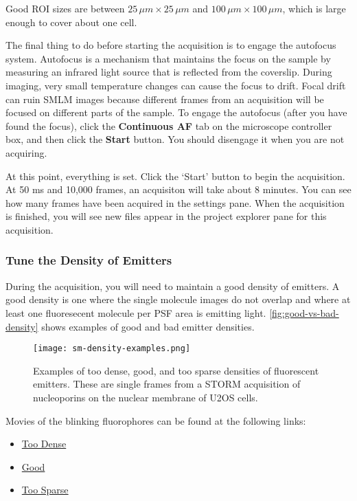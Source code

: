 \documentclass[10pt,a4paper,oneside]{book}
\begin{document}
Good ROI sizes are between $25 \, \mu m\times 25 \, \mu m$ and $100 \, \mu m\times 100 \, \mu m$, which is large enough to cover about one cell.

The final thing to do before starting the acquisition is to engage the autofocus system. Autofocus is a mechanism that maintains the focus on the sample by measuring an infrared light source that is reflected from the coverslip. During imaging, very small temperature changes can cause the focus to drift. Focal drift can ruin SMLM images because different frames from an acquisition will be focused on different parts of the sample. To engage the autofocus (after you have found the focus), click the \textbf{Continuous AF} tab on the microscope controller box, and then click the \textbf{Start} button. You should disengage it when you are not acquiring.

At this point, everything is set. Click the `Start' button to begin the acquisition. At 50 ms and 10,000 frames, an acquisiton will take about 8 minutes. You can see how many frames have been acquired in the settings pane. When the acquisition is finished, you will see new files appear in the project explorer pane for this acquisition.

\subsubsection{Tune the Density of Emitters}

During the acquisition, you will need to maintain a good density of emitters. A good density is one where the single molecule images do not overlap and where at least one fluoresecent molecule per PSF area is emitting light. \autoref{fig:good-vs-bad-density} shows examples of good and bad emitter densities.

\begin{figure}[ht]
    \centering
    \texttt{[image: sm-density-examples.png]}
    \caption{Examples of too dense, good, and too sparse densities of fluorescent emitters. These are single frames from a STORM acquisition of nucleoporins on the nuclear membrane of U2OS cells.}
    \label{fig:good-vs-bad-density}
\end{figure}

Movies of the blinking fluorophores can be found at the following links:

\begin{itemize}
    \item \href{https://drive.google.com/file/d/12zIK-BqMl0qttkYljKi7P9xZ3krMvthe/view?usp=sharing}{Too Dense}
    \item \href{https://drive.google.com/file/d/1Is4U-K297sku4u20OJqwY6IOUags1bLl/view?usp=sharing}{Good}
    \item \href{https://drive.google.com/file/d/1W2AxVjYirPj8t8d2__m8rNoNTUyM3RfY/view?usp=sharing}{Too Sparse}
\end{itemize}
\end{document}
